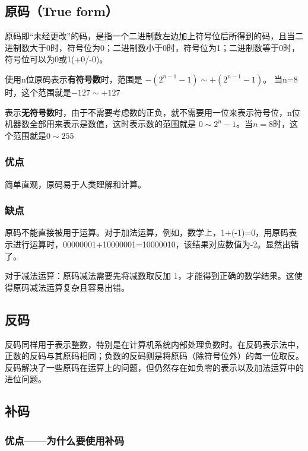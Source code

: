 \begin{issues}
\issueDraft
\end{issues}


\subsection{原码（True form）}

原码即“未经更改”的码，是指一个二进制数左边加上符号位后所得到的码，且当二进制数大于0时，符号位为0；二进制数小于0时，符号位为1；二进制数等于0时，符号位可以为0或1(+0/-0)。

使用n位原码表示\textbf{有符号数}时，范围是 $-(2^{n-1}-1)\sim +(2^{n-1}-1)$。 当n=8时，这个范围就是$-127\sim +127 $

表示\textbf{无符号数}时，由于不需要考虑数的正负，就不需要用一位来表示符号位，n位机器数全部用来表示是数值，这时表示数的范围就是
$0\sim 2^{n}-1$。当$n=8$时，这个范围就是$0\sim 255$

\subsubsection{优点}

简单直观，原码易于人类理解和计算。

\subsubsection{缺点}
原码不能直接被用于运算。对于加法运算，例如，数学上，1+(-1)=0，用原码表示进行运算时，00000001+10000001=10000010，该结果对应数值为-2。显然出错了。

对于减法运算：原码减法需要先将减数取反加 1，才能得到正确的数学结果。这使得原码减法运算复杂且容易出错。

\subsection{反码}

反码同样用于表示整数，特别是在计算机系统内部处理负数时。在反码表示法中，正数的反码与其原码相同；负数的反码则是将原码（除符号位外）的每一位取反。反码解决了一些原码在运算上的问题，但仍然存在如负零的表示以及加法运算中的进位问题。

\subsection{补码}

\subsubsection{优点——为什么要使用补码}






